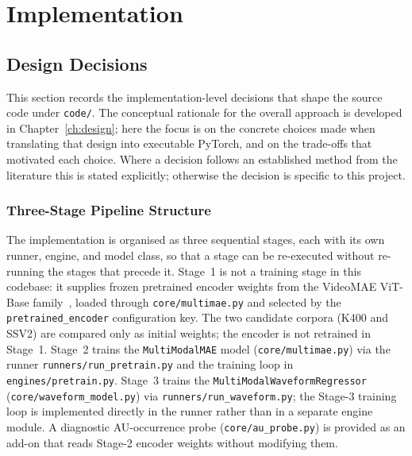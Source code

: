 

\chapter{Implementation}
\label{ch:implementation}

\section{Design Decisions}
\label{sec:impl-design}

This section records the implementation-level decisions that shape the source code under
\texttt{code/}. The conceptual rationale for the overall approach is developed in
Chapter~\ref{ch:design}; here the focus is on the concrete choices made when translating
that design into executable PyTorch, and on the trade-offs that motivated each choice.
Where a decision follows an established method from the literature this is stated
explicitly; otherwise the decision is specific to this project.

\subsection{Three-Stage Pipeline Structure}
\label{sec:impl-design-pipeline}

The implementation is organised as three sequential stages, each with its own runner,
engine, and model class, so that a stage can be re-executed without re-running the stages
that precede it. Stage~1 is not a training stage in this codebase: it supplies frozen
pretrained encoder weights from the VideoMAE ViT-Base family~\cite{tong2022videomae},
loaded through \texttt{core/multimae.py} and selected by the \texttt{pretrained\_encoder}
configuration key. The two candidate corpora (K400 and SSV2) are compared only as initial
weights; the encoder is not retrained in Stage~1. Stage~2 trains the
\texttt{MultiModalMAE} model (\texttt{core/multimae.py}) via the runner
\texttt{runners/run\_pretrain.py} and the training loop in \texttt{engines/pretrain.py}.
Stage~3 trains the \texttt{MultiModalWaveformRegressor} (\texttt{core/waveform\_model.py})
via \texttt{runners/run\_waveform.py}; the Stage-3 training loop is implemented directly in
the runner rather than in a separate engine module. A diagnostic AU-occurrence probe
(\texttt{core/au\_probe.py}) is provided as an add-on that reads Stage-2 encoder weights
without modifying them.

